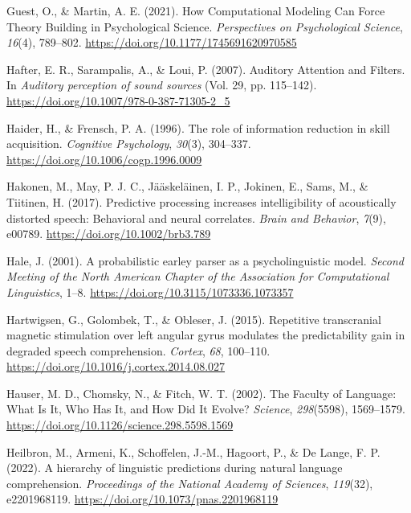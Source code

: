 \documentclass[a4paper, nobind]{templates/ociamthesis}
\newlength{\cslhangindent}
\newenvironment{CSLReferences}[2] %
 {%
  \setlength{\parindent}{0pt}
  \ifodd #1
  \let\oldpar\par
  \def\par{\hangindent=\cslhangindent\oldpar}
  \fi
  \setlength{\parskip}{1mm}
  \setlength{\baselineskip}{6mm}
 }%
 {}
\begin{document}
\begin{CSLReferences}{1}{0}
\leavevmode{}%
Guest, O., \& Martin, A. E. (2021). {How Computational Modeling Can Force Theory Building in Psychological Science}. \emph{Perspectives on Psychological Science}, \emph{16}(4), 789--802. \url{https://doi.org/10.1177/1745691620970585}

\leavevmode{}%
Hafter, E. R., Sarampalis, A., \& Loui, P. (2007). {Auditory Attention and Filters}. In \emph{Auditory perception of sound sources} (Vol. 29, pp. 115--142). \url{https://doi.org/10.1007/978-0-387-71305-2_5}

\leavevmode{}%
Haider, H., \& Frensch, P. A. (1996). The role of information reduction in skill acquisition. \emph{Cognitive Psychology}, \emph{30}(3), 304--337. \url{https://doi.org/10.1006/cogp.1996.0009}

\leavevmode{}%
Hakonen, M., May, P. J. C., Jääskeläinen, I. P., Jokinen, E., Sams, M., \& Tiitinen, H. (2017). Predictive processing increases intelligibility of acoustically distorted speech: Behavioral and neural correlates. \emph{Brain and Behavior}, \emph{7}(9), e00789. \url{https://doi.org/10.1002/brb3.789}

\leavevmode{}%
Hale, J. (2001). A probabilistic earley parser as a psycholinguistic model. \emph{Second Meeting of the North American Chapter of the Association for Computational Linguistics}, 1--8. \url{https://doi.org/10.3115/1073336.1073357}

\leavevmode{}%
Hartwigsen, G., Golombek, T., \& Obleser, J. (2015). Repetitive transcranial magnetic stimulation over left angular gyrus modulates the predictability gain in degraded speech comprehension. \emph{Cortex}, \emph{68}, 100--110. \url{https://doi.org/10.1016/j.cortex.2014.08.027}

\leavevmode{}%
Hauser, M. D., Chomsky, N., \& Fitch, W. T. (2002). The Faculty of Language: What Is It, Who Has It, and How Did It Evolve? \emph{Science}, \emph{298}(5598), 1569--1579. \url{https://doi.org/10.1126/science.298.5598.1569}

\leavevmode{}%
Heilbron, M., Armeni, K., Schoffelen, J.-M., Hagoort, P., \& De Lange, F. P. (2022). A hierarchy of linguistic predictions during natural language comprehension. \emph{Proceedings of the National Academy of Sciences}, \emph{119}(32), e2201968119. \url{https://doi.org/10.1073/pnas.2201968119}


\end{CSLReferences}
\end{document}
